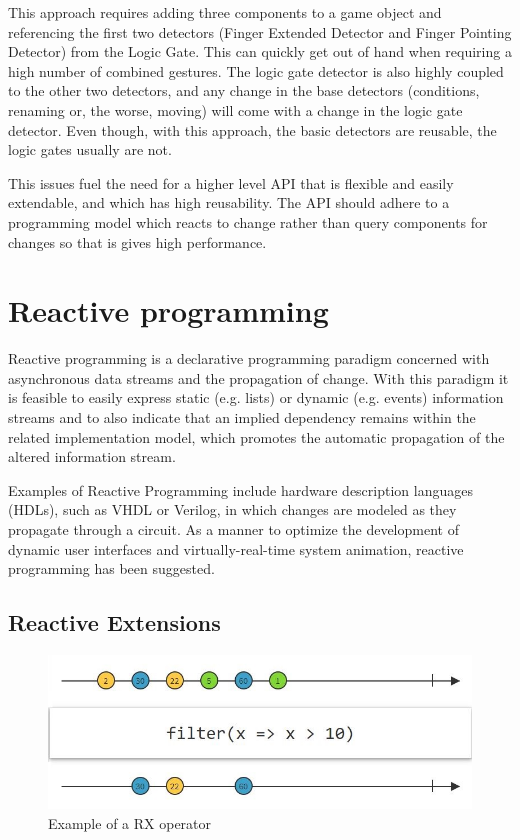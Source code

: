 \documentclass[12pt,a4paper,twoside]{report}
\begin{document}
This approach requires adding three components to a game object and referencing the first two detectors (Finger Extended Detector and Finger Pointing Detector) from the Logic Gate. This can quickly get out of hand when requiring a high number of combined gestures. The logic gate detector is also highly coupled to the other two detectors, and any change in the base detectors (conditions, renaming or, the worse, moving) will come with a change in the logic gate detector. Even though, with this approach, the basic detectors are reusable, the logic gates usually are not.

This issues fuel the need for a higher level API that is flexible and easily extendable, and which has high reusability. The API should adhere to a programming model which reacts to change rather than query components for changes so that is gives high performance.

\section{Reactive programming}
Reactive programming is a declarative programming paradigm concerned with asynchronous data streams and the propagation of change. With this paradigm it is feasible to easily express static (e.g. lists) or dynamic (e.g. events) information streams and to also indicate that an implied dependency remains within the related implementation model, which promotes the automatic propagation of the altered information stream.

Examples of Reactive Programming include hardware description languages (HDLs), such as VHDL or Verilog, in which changes are modeled as they propagate through a circuit. As a manner to optimize the development of dynamic user interfaces and virtually-real-time system animation, reactive programming has been suggested.

\subsection{Reactive Extensions}

\begin{figure}[h]
  \centering
  \includegraphics[width=0.9\linewidth]{img/RX_filter.JPG}
  \caption[]{Example of a RX operator \footnotemark}
  \label{fig:rx_filter}
\end{figure}
\end{document}
